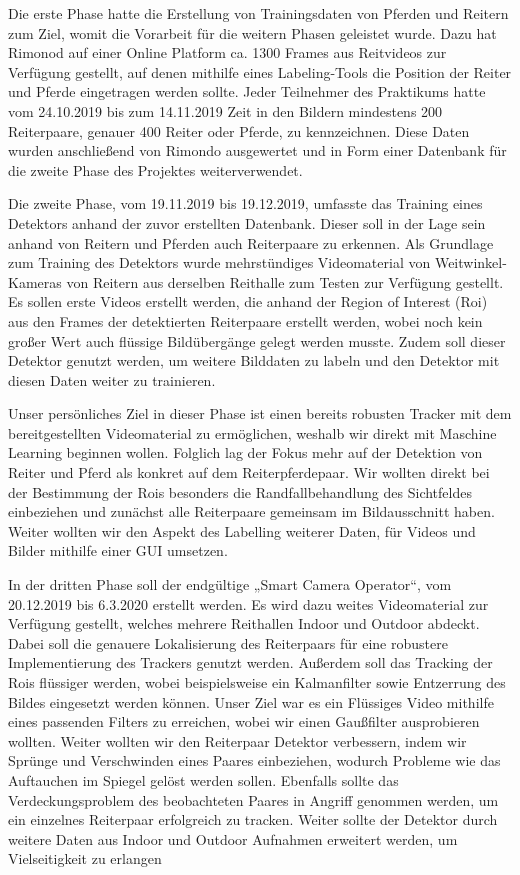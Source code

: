 Die erste Phase hatte die Erstellung von Trainingsdaten von Pferden und Reitern zum Ziel, womit die Vorarbeit für die weitern Phasen geleistet wurde. Dazu hat Rimonod auf einer Online Platform ca. 1300 Frames aus Reitvideos zur Verfügung gestellt, auf denen mithilfe eines Labeling-Tools die Position der Reiter und Pferde eingetragen werden sollte. Jeder Teilnehmer des Praktikums hatte vom 24.10.2019 bis zum 14.11.2019 Zeit in den Bildern mindestens 200 Reiterpaare, genauer 400 Reiter oder Pferde, zu kennzeichnen. Diese Daten wurden anschließend von Rimondo ausgewertet und in Form einer Datenbank für die zweite Phase des Projektes weiterverwendet. 

Die zweite Phase, vom 19.11.2019 bis 19.12.2019, umfasste das Training eines Detektors anhand der zuvor erstellten Datenbank. Dieser soll in der Lage sein anhand von Reitern und Pferden auch Reiterpaare zu erkennen. Als Grundlage zum Training des Detektors wurde mehrstündiges Videomaterial von Weitwinkel-Kameras von Reitern aus derselben Reithalle zum Testen zur Verfügung gestellt. Es sollen erste Videos erstellt werden, die anhand der Region of Interest (Roi) aus den Frames der detektierten Reiterpaare erstellt werden, wobei noch kein großer Wert auch flüssige Bildübergänge gelegt werden musste. Zudem soll dieser Detektor genutzt werden, um weitere Bilddaten zu labeln und den Detektor mit diesen Daten weiter zu trainieren.

Unser persönliches Ziel in dieser Phase ist einen bereits robusten Tracker mit dem bereitgestellten Videomaterial zu ermöglichen, weshalb wir direkt mit Maschine Learning beginnen wollen. Folglich lag der Fokus mehr auf der Detektion von Reiter und Pferd als konkret auf dem Reiterpferdepaar. Wir wollten direkt bei der Bestimmung der Rois besonders die Randfallbehandlung des Sichtfeldes einbeziehen und zunächst alle Reiterpaare gemeinsam im Bildausschnitt haben. Weiter wollten wir den Aspekt des Labelling weiterer Daten, für Videos und Bilder mithilfe einer GUI umsetzen.

In der dritten Phase soll der endgültige „Smart Camera Operator“, vom 20.12.2019 bis 6.3.2020 erstellt werden. Es wird dazu weites Videomaterial zur Verfügung gestellt, welches mehrere Reithallen Indoor und Outdoor abdeckt. Dabei soll die genauere Lokalisierung des Reiterpaars für eine robustere Implementierung des Trackers genutzt werden. Außerdem soll das Tracking der Rois flüssiger werden, wobei beispielsweise ein Kalmanfilter sowie Entzerrung des Bildes eingesetzt werden können.
Unser Ziel war es ein Flüssiges Video mithilfe eines passenden Filters zu erreichen, wobei wir einen Gaußfilter ausprobieren wollten. Weiter wollten wir den Reiterpaar Detektor verbessern, indem wir Sprünge und Verschwinden eines Paares einbeziehen, wodurch Probleme wie das Auftauchen im Spiegel gelöst werden sollen. Ebenfalls sollte das Verdeckungsproblem des beobachteten Paares in Angriff genommen werden, um ein einzelnes Reiterpaar erfolgreich zu tracken. Weiter sollte der Detektor durch weitere Daten aus Indoor und Outdoor Aufnahmen erweitert werden, um Vielseitigkeit zu erlangen



